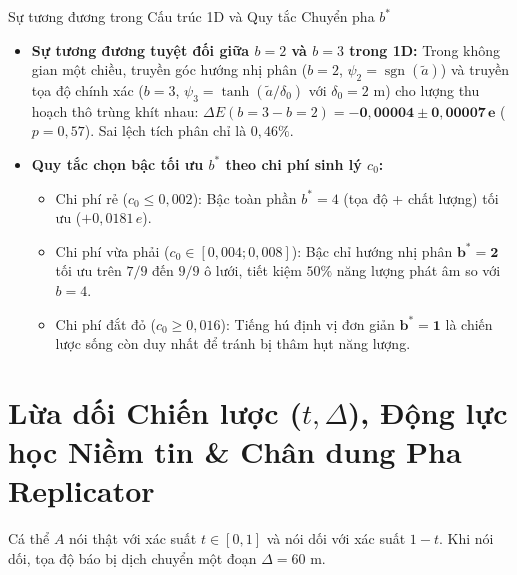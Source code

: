 \documentclass[11pt,a4paper]{report}
\begin{document}
\begin{ketqua}{Sự tương đương trong Cấu trúc 1D và Quy tắc Chuyển pha $b^*$}
\begin{itemize}
  \item \textbf{Sự tương đương tuyệt đối giữa $b=2$ và $b=3$ trong 1D:} Trong không gian một chiều, truyền góc hướng nhị phân ($b=2$, $\psi_2 = \operatorname{sgn}(\tilde{a})$) và truyền tọa độ chính xác ($b=3$, $\psi_3 = \tanh(\tilde{a}/\delta_0)$ với $\delta_0 = 2\text{ m}$) cho lượng thu hoạch thô trùng khít nhau: $\Delta E(b=3 - b=2) = \mathbf{-0{,}00004 \pm 0{,}00007\,e}$ ($p = 0{,}57$). Sai lệch tích phân chỉ là $0{,}46\%$.
  \item \textbf{Quy tắc chọn bậc tối ưu $b^*$ theo chi phí sinh lý $c_0$:}
  \begin{itemize}
    \item Chi phí rẻ ($c_0 \le 0{,}002$): Bậc toàn phần $b^* = 4$ (tọa độ + chất lượng) tối ưu ($+0{,}0181\,e$).
    \item Chi phí vừa phải ($c_0 \in [0{,}004; 0{,}008]$): Bậc chỉ hướng nhị phân $\mathbf{b^* = 2}$ tối ưu trên $7/9$ đến $9/9$ ô lưới, tiết kiệm $50\%$ năng lượng phát âm so với $b=4$.
    \item Chi phí đắt đỏ ($c_0 \ge 0{,}016$): Tiếng hú định vị đơn giản $\mathbf{b^* = 1}$ là chiến lược sống còn duy nhất để tránh bị thâm hụt năng lượng.
  \end{itemize}
\end{itemize}
\end{ketqua}

\section{Lừa dối Chiến lược (\texorpdfstring{$t, \Delta$}{t, Delta}), Động lực học Niềm tin \& Chân dung Pha Replicator}
Cá thể $A$ nói thật với xác suất $t \in [0, 1]$ và nói dối với xác suất $1-t$. Khi nói dối, tọa độ báo bị dịch chuyển một đoạn $\Delta = 60\text{ m}$.
\end{document}
